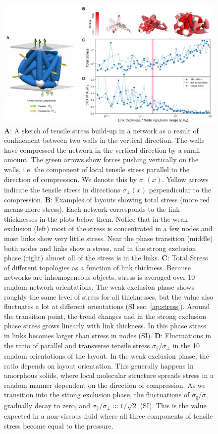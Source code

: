 \documentclass[nofootinbib,preprint,floatfix,titlepage,endfloats]{revtex4} %
\begin{document}
\begin{figure}
    \centering
    \includegraphics[width=1\columnwidth]{fig-09-19/stress-plots-2.png}
    \caption{\scriptsize
    {\bf A}: A sketch of tensile stress build-up in a network as a result of confinement between two walls in the vertical direction. 
    The walls have compressed the network in the vertical direction by a small amount. 
    The green arrows show forces pushing vertically on the walls, i.e. the component of local tensile stress parallel to the direction of compression. 
    We denote this by $\sigma_\parallel(x)$. 
    Yellow arrows indicate the tensile stress in directions $\sigma_\perp(x)$
    perpendicular to the compression. 
    {\bf B}: Examples of layouts showing total stress (more red means more stress).  
    Each network corresponds to the  link thicknesses in the plots below them.
    Notice that in the weak exclusion (left) most of the stress is concentrated in a few nodes and most links show very little stress. 
    Near the phase transition (middle) both nodes and links show a stress, and in the strong exclusion phase (right) almost all of the stress is in the links. 
    {\bf C}: Total Stress of different topologies as a function of link thickness. Because networks are inhomogeneous objects, stress is averaged over 10 random network orientations. The weak exclusion phase shows roughly the same level of stress for all thicknesses, but the value also fluctuates a lot at different orientations (SI sec. \ref{ap:stress}).  Around the transition point, the trend changes and in the strong exclusion phase stress grows linearly with link thickness. In this phase stress in links becomes larger than stress in nodes (SI). {\bf D}: Fluctuations in the ratio of parallel and transverse tensile stress $\sigma_\parallel/\sigma_\perp$ in the 10 random orientations of the layout. In the weak exclusion phase, the ratio depends on layout orientation. This generally happens in amorphous solids, where local molecular structure spreads stress in a random manner dependent on the direction of compression. As we transition into the strong exclusion phase, the fluctuations of $\sigma_\parallel/\sigma_\perp$ gradually decay to zero, and $\sigma_\parallel/\sigma_\perp \approx 1/\sqrt{2}$ (SI). This is the value expected in a non-viscous fluid where all three components of tensile stress become equal to the pressure.}
    \label{fig:stress}
\end{figure}
\end{document}
